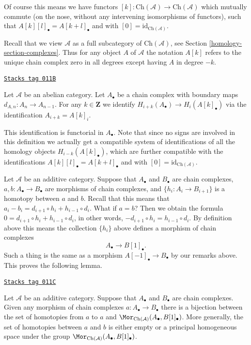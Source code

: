 Of course this means we have functors
$[k] : \text{Ch}(\mathcal{A}) \to \text{Ch}(\mathcal{A})$
which mutually commute (on the nose, without
any intervening isomorphisms of functors),
such that $A[k][l]_\bullet = A[k + l]_\bullet$ and
with $[0] = \text{id}_{\text{Ch}(\mathcal{A})}$.

\medskip\noindent
Recall that we view $\mathcal{A}$ as a full subcategory of
$\text{Ch}(\mathcal{A})$, see Section \ref{homology-section-complexes}.
Thus for any object $A$ of $\mathcal{A}$ the notation $A[k]$
refers to the unique chain complex zero in all degrees except having
$A$ in degree $-k$.

\begin{definition}
\label{homology-definition-homology-shift}
\href{https://stacks.math.columbia.edu/tag/011B}{\texttt{Stacks tag 011B}}

Let $\mathcal{A}$ be an abelian category.
Let $A_\bullet$ be a chain complex
with boundary maps $d_{A, n} : A_n \to A_{n - 1}$.
For any $k \in \mathbf{Z}$ we identify
{\it $H_{i + k}(A_\bullet) \rightarrow H_i(A[k]_\bullet)$}
via the identification
$A_{i + k} = A[k]_i$.
\end{definition}

This identification is functorial in $A_\bullet$.
Note that since no signs are involved in this
definition we actually get a compatible system
of identifications of all the homology
objects $H_{i - k}(A[k]_\bullet)$, which are
further compatible with the identifications
$A[k][l]_\bullet = A[k + l]_\bullet$ and
with $[0] = \text{id}_{\text{Ch}(\mathcal{A})}$.

\medskip\noindent
Let $\mathcal{A}$ be an additive category.
Suppose that $A_\bullet$ and $B_\bullet$ are
chain complexes, $a, b : A_\bullet \to B_\bullet$ are
morphisms of chain complexes, and $\{h_i : A_i \to B_{i + 1}\}$
is a homotopy between $a$ and $b$. Recall that this means
that
$a_i - b_i = d_{i + 1} \circ h_i + h_{i - 1} \circ d_i$.
What if $a = b$? Then we obtain the formula
$0 = d_{i + 1} \circ h_i + h_{i - 1} \circ d_i$,
in other words, $ - d_{i + 1} \circ h_i = h_{i - 1} \circ d_i$.
By definition above this means the collection $\{h_i\}$
above defines a morphism of chain complexes
$$
A_\bullet \longrightarrow B[1]_\bullet.
$$
Such a thing is the same as a morphism $A[-1]_\bullet \to B_\bullet$
by our remarks above. This proves the following lemma.

\begin{lemma}
\label{homology-lemma-homotopy-shift}
\href{https://stacks.math.columbia.edu/tag/011C}{\texttt{Stacks tag 011C}}

Let $\mathcal{A}$ be an additive category.
Suppose that $A_\bullet$ and $B_\bullet$ are
chain complexes. Given any morphism of chain
complexes $a : A_\bullet \to B_\bullet$ there
is a bijection between the set of homotopies
from $a$ to $a$ and
$\Mor_{\text{Ch}(\mathcal{A})}(A_\bullet, B[1]_\bullet)$.
More generally, the set of homotopies between
$a$ and $b$ is either empty or a principal homogeneous
space under the group
$\Mor_{\text{Ch}(\mathcal{A})}(A_\bullet, B[1]_\bullet)$.
\end{lemma}

